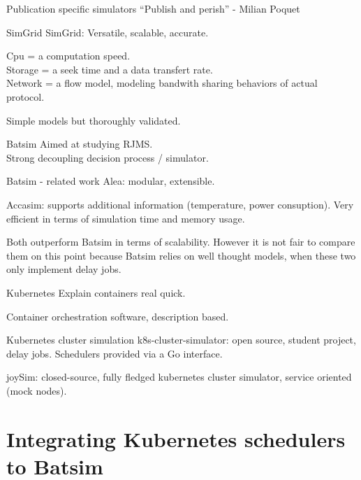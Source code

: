 \documentclass[12pt, aspectratio=43]{beamer}
\begin{document}
\begin{frame}{Publication specific simulators}
	``Publish and perish'' - Milian Poquet
\end{frame}

\begin{frame}{SimGrid}
	SimGrid: Versatile, scalable, accurate.

	Cpu = a computation speed.\\
	Storage = a seek time and a data transfert rate.\\
	Network = a flow model, modeling bandwith sharing behaviors of actual
	protocol.

	Simple models but thoroughly validated.
\end{frame}

\begin{frame}{Batsim}
	Aimed at studying RJMS.\\
	Strong decoupling decision process / simulator.
\end{frame}

\begin{frame}{Batsim - related work}
	Alea: modular, extensible.

	Accasim: supports additional information (temperature, power
	consuption). Very efficient in terms of simulation time and memory
	usage.

	Both outperform Batsim in terms of scalability. However it is not fair
	to compare them on this point because Batsim relies on well thought
	models, when these two only implement delay jobs.
\end{frame}

\begin{frame}{Kubernetes}
	Explain containers real quick.

	Container orchestration software, description based.
\end{frame}

\begin{frame}{Kubernetes cluster simulation}
	k8s-cluster-simulator: open source, student project, delay jobs.
	Schedulers provided via a Go interface.

	joySim: closed-source, fully fledged kubernetes cluster simulator,
	service oriented (mock nodes).
\end{frame}

\section{Integrating Kubernetes schedulers to Batsim}
\end{document}
